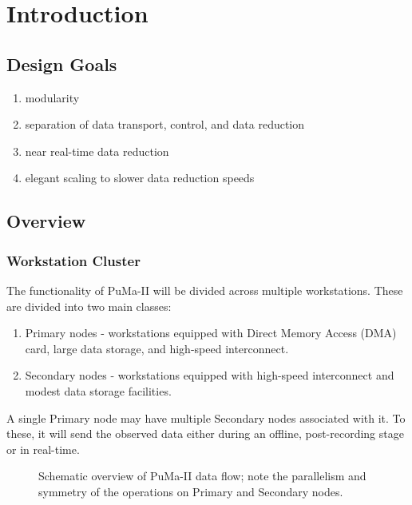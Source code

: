 
\chapter{Introduction}

\section{Design Goals}

\begin{enumerate}
\item modularity

\item separation of data transport, control, and data reduction

\item near real-time data reduction

\item elegant scaling to slower data reduction speeds
\end{enumerate}

\section{Overview}

\subsection{Workstation Cluster}

The functionality of PuMa-II will be divided across multiple workstations.
These are divided into two main classes:

\begin{enumerate}

\item Primary nodes - workstations equipped with Direct Memory Access 
	(DMA) card, large data storage, and high-speed interconnect.

\item Secondary nodes - workstations equipped with high-speed interconnect
	and modest data storage facilities.

\end{enumerate}

A single Primary node may have multiple Secondary nodes associated
with it.  To these, it will send the observed data either during an
offline, post-recording stage or in real-time.

\begin{figure}
\centerline{}
\caption [\sffamily PuMa-II Data Flow]
{
Schematic overview of PuMa-II data flow; note the parallelism and 
symmetry of the operations on Primary and Secondary nodes.
}
\label{fig:layout}
\end{figure}

